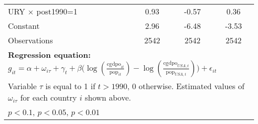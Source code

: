 \begin{sidewaystable}[htbp]
\begin{tabular}{l*{3}{c}}
URY $\times$ post1990=1&     0.93\sym{***}&    -0.57\sym{***}&     0.36         \\
Constant        &     2.96\sym{**} &    -6.48\sym{***}&    -3.53         \\
\midrule
Observations    &     2542         &     2542         &     2542         \\
\bottomrule
\multicolumn{4}{l}{\footnotesize \textbf{Regression equation:} \(g_{it} = \alpha + \omega_{i\tau} + \gamma_t + \beta \big(\log (\frac{\textrm{cgdpo}_{it}}{\textrm{pop}_{it}} ) - \log (\frac{\textrm{cgdpo}_{USA,t}}{\textrm{pop}_{USA,t}}  ) \big) + \epsilon_{it}\)}\\
\multicolumn{4}{l}{\footnotesize Variable \(\tau\) is equal to 1 if \(t > 1990\), 0 otherwise. Estimated values of \(\omega_{i\tau}\) for each country \(i\) shown above.}\\
\multicolumn{4}{l}{\footnotesize \sym{*} \(p<0.1\), \sym{**} \(p<0.05\), \sym{***} \(p<0.01\)}\\
\end{tabular}
\end{sidewaystable}
